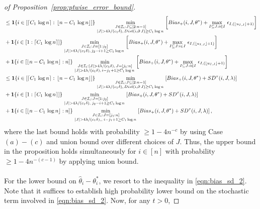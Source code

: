 \documentclass[11pt]{article}
\newcommand{\one}{\mathbf 1}
\newcommand{\I}{\mathcal{I}}
\theoremstyle{plain}
\theoremstyle{definition}
\theoremstyle{remark}
\begin{document}
\begin{appendix}
\begin{proof}[of Proposition~\ref{prop:ptwise_error_bound}]
\begin{align*}
    &\leq \one \{i\in [\lceil C_1\,\log n\rceil:\,\lfloor n-C_1\,\log n\rfloor]\}\, \min_{\substack{J \in \I_i:J\subseteq [2:n-1]\\ |J|>4\lambda/(c_1\delta),\,Dist(i,\partial\,J)\geq C_1 \log n\,}}\left[Bias_+(i,J,\theta^*)+\max_{I\subseteq J: i \in I}\,\epsilon_{I,(\lfloor u_{I,J}\rfloor+1)}\right]\allowdisplaybreaks\\
    &+\one \{i\in [1:\lceil C_1\,\log n\rceil]\}\, \min_{\substack{J \in \I_i:J= [1:j_2]\\ |J|>4\lambda/(c_1\delta),\,j_2-i+1\geq C_1 \log n\,}}\left[Bias_+(i,J,\theta^*)+\max_{I\subseteq J: i \in I}\,\epsilon_{I,(\lfloor u_{I,J}\rfloor+1)}\right]\\
    &+\one \{i\in [\lfloor n-C_1\,\log n\rfloor:n]\}\, \min_{\substack{J \in \I_i:|J|>4\lambda/(c_1\delta),\,J= [j_1:n]\\ |J|>4\lambda/(c_1\delta),\,i-j_1+1\geq C_1 \log n\,}}\left[Bias_+(i,J,\theta^*)+\max_{I\subseteq J: i \in I}\,\epsilon_{I,(\lfloor u_{I,J}\rfloor+1)}\right]\\
     &\leq \one \{i\in [\lceil C_1\,\log n\rceil:\,\lfloor n-C_1\,\log n\rfloor]\}\, \min_{\substack{J \in \I_i: J\subseteq [2:n-1]\\ |J|>4\lambda/(c_1\delta),\,Dist(i,\partial\,J)\geq C_1 \log n\,}}\left[Bias_+(i,J,\theta^*)+SD^{\tau}(i,J,\lambda)\right]\\
    &+\one \{i\in [1:\lceil C_1\,\log n\rceil]\}\, \min_{\substack{J \in \I_i:J= [1:j_2]\\ |J|>4\lambda/(c_1\delta),\;j_2-i+1\geq C_1 \log n\,}}\left[Bias_+(i,J,\theta^*)+SD^{\tau}(i,J,\lambda)\right]\\
    &+\one \{i\in [\lfloor n-C_1\,\log n\rfloor:n]\}\, \min_{\substack{J \in \I_i:J= [j_1:n]\\ |J|>4\lambda/(c_1\delta),,\;i-j_1+1\geq C_1 \log n\,}}\left[Bias_+(i,J,\theta^*)+SD^{\tau}(i,J,\lambda)\right],\\
\end{align*}
where the last bound holds with probability $\geq 1-4 n^{-c}$ by using Case $(a)-(c)$ and union bound over different choices of $J$. Thus, the upper bound in the proposition holds simultaneously for $i\in [n]$ with probability $\geq 1-4n^{-(c-1)}$ by applying union bound. \\
\\
For the lower bound on $\hat{\theta}_{i}-\theta^*_i$, we resort to the inequality in \eqref{eqn:bias_sd_2}. Note that it suffices to establish high probability lower bound on the stochastic term involved in \eqref{eqn:bias_sd_2}. Now, for any $t>0$,

\end{proof}
\end{appendix}
\end{document}
